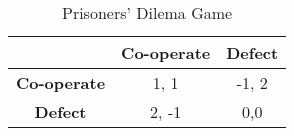 \begin{table}[h]
\centering 
\begin{tabular}{c|cc}
\hline
	 & \textbf{Co-operate} & \textbf{Defect} \\ 
\hline
\textbf{Co-operate} 	& 1, 1 	& -1, 2  	\\
 \textbf{Defect} 		& 2, -1 	& 0,0		\\
\hline 
\end{tabular}

\caption{Prisoners' Dilema Game} 
\label{tab:prisoners_dilema}
\end{table}
